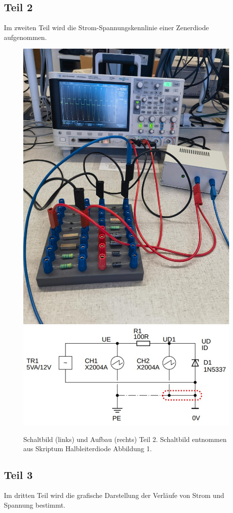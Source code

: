 \documentclass[12pt,a4paper,twoside]{article}
\begin{document}
\subsection{Teil 2}
Im zweiten Teil wird die Strom-Spannungskennlinie einer Zenerdiode aufgenommen. 

\begin{figure}[H]
    \centering
    \includegraphics[width=0.4\linewidth]{nudes/2.jpg}
    \includegraphics[width=0.4\linewidth]{nudes/aufbau2 schaltplan.jpg}
    \caption{Schaltbild (links) und Aufbau (rechts) Teil 2. Schaltbild entnommen aus Skriptum Halbleiterdiode Abbildung 1. \cite{teachcenter2}}
    \label{fig:aufbau 2}
\end{figure}

\subsection{Teil 3}
Im dritten Teil wird die grafische Darstellung der Verläufe von Strom und Spannung bestimmt. 
\end{document}
